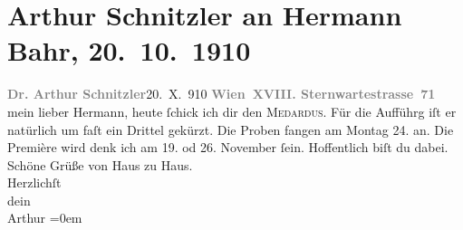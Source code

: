 

         
         \renewcommand{\erwaehntePersonen}{Personen: Hermann Bahr}
         \renewcommand{\erwaehnteOrte}{Orte: London, Sternwartestraße, Wien}
         \renewcommand{\erwaehnteWerke}{Werke: Der junge Medardus. Dramatische Historie in einem Vorspiel und fünf Aufzügen}
               \section[Arthur Schnitzler an Hermann Bahr, 20. 10. 1910]{ Arthur Schnitzler an Hermann Bahr, 20. 10. 1910}\nopagebreak{}\rehead{ }\begin{ledgroupsized}[t]{13cm}\normalsize\beginnumbering \toendnotes[C]{\smallbreak\pagebreak[2]} 
\pstart
           \noindent{}{\pb}\textcolor{gray}{\textbf{Dr. Arthur Schnitzler}}\hfill 20. X. 910\pend
           \pstart
           \textcolor{gray}{\textbf{Wien XVIII. Sternwartestrasse 71}}\pend
           \pstart{}mein lieber Hermann,\pend\pstart
           heute ſchick ich dir den \textsc{Medardus}. Für die Aufführg iſt er natürlich um faſt ein Drittel gekürzt. Die Proben
               fangen {\pb}am Montag
                  24. an. Die Première wird denk ich am 19. od 26.
                  November{ }ſein.\pend
           \pstart
           Hoffentlich biſt du dabei.\pend
           \pstart
           Schöne Grüße von Haus zu Haus.{\\[\baselineskip]}Herzlichſt{\\[\baselineskip]}dein{\\[\baselineskip]}\spacefill\mbox{Arthur}\pend
           \leftskip=0em{}
         
         \endnumbering{}\end{ledgroupsized}  \newcommand{\dateiname}{L01967}\newcommand{\titel}{Arthur Schnitzler an Hermann Bahr, 20. 10. 1910}\newcommand{\editorInnen}{ Kurt Ifkovits,  Martin Anton Müller}
      